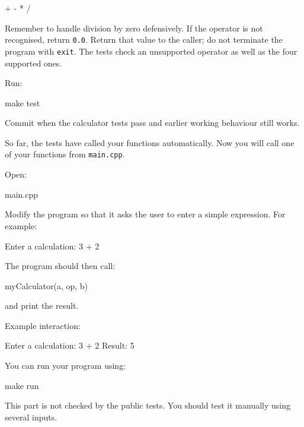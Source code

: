 \documentclass{csc2059practical}
\begin{document}
\begin{terminal}
+
-
*
/
\end{terminal}

Remember to handle division by zero defensively. If the operator is not recognised, return \texttt{0.0}. Return that value to the caller; do not terminate the program with \texttt{exit}. The tests check an unsupported operator as well as the four supported ones.

Run:

\begin{bashcode}
make test
\end{bashcode}

Commit when the calculator tests pass and earlier working behaviour still works.


So far, the tests have called your functions automatically. Now you will call one of your functions from \texttt{main.cpp}.

Open:

\begin{terminal}
main.cpp
\end{terminal}

Modify the program so that it asks the user to enter a simple expression. For example:

\begin{terminal}
Enter a calculation: 3 + 2
\end{terminal}

The program should then call:

\begin{cppcode}
myCalculator(a, op, b)
\end{cppcode}

and print the result.

Example interaction:

\begin{terminal}
Enter a calculation: 3 + 2
Result: 5
\end{terminal}

You can run your program using:

\begin{bashcode}
make run
\end{bashcode}

\begin{importantnote}
This part is not checked by the public tests. You should test it manually using several inputs.
\end{importantnote}
\end{document}
